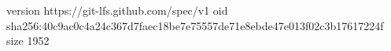 version https://git-lfs.github.com/spec/v1
oid sha256:40c9ac0c4a24c367d7faec18be7e75557de71e8ebde47e013f02c3b17617224f
size 1952
